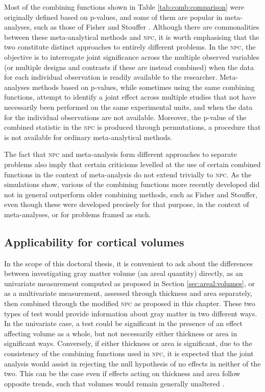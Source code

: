 Most of the combining functions shown in Table \ref{tab:comb:comparison} were originally defined based on p-values, and some of them are popular in meta-analyses, such as those of Fisher and Stouffer \citep{Borenstein2009}. Although there are commonalities between these meta-analytical methods and \textsc{npc}, it is worth emphasising that the two constitute distinct approaches to entirely different problems. In the \textsc{npc}, the objective is to interrogate joint significance across the multiple observed variables (or multiple designs and contrasts if these are instead combined) when the data for each individual observation is readily available to the researcher. Meta-analyses methods based on p-values, while sometimes using the same combining functions, attempt to identify a joint effect across multiple studies that not have necessarily been performed on the same experimental units, and when the data for the individual observations are not available. Moreover, the p-value of the combined statistic in the \textsc{npc} is produced through permutations, a procedure that is not available for ordinary meta-analytical methods. 

The fact that \textsc{npc} and meta-analysis form different approaches to separate problems also imply that certain criticisms levelled at the use of certain combined functions in the context of meta-analysis do not extend trivially to \textsc{npc}. As the simulations show, various of the combining functions more recently developed did not in general outperform older combining methods, such as Fisher and Stouffer, even though these were developed precisely for that purpose, in the context of meta-analyses, or for problems framed as such.

\subsection{Applicability for cortical volumes}

In the scope of this doctoral thesis, it is convenient to ask about the differences between investigating gray matter volume (an areal quantity) directly, as an univariate measurement computed as proposed in Section \ref{sec:areal:volumes}, or as a multivariate measurement, assessed through thickness and area separately, then combined through the modified \textsc{npc} as proposed in this chapter. These two types of test would provide information about gray matter in two different ways. In the univariate case, a test could be significant in the presence of an effect affecting volume as a whole, but not necessarily either thickness or area in significant ways. Conversely, if either thickness or area is significant, due to the consistency of the combining functions used in \textsc{npc}, it is expected that the joint analysis would assist in rejecting the null hypothesis of no effects in neither of the two. This can be the case even if effects acting on thickness and area follow opposite trends, such that volumes would remain generally unaltered \citep{Brown2012}.

